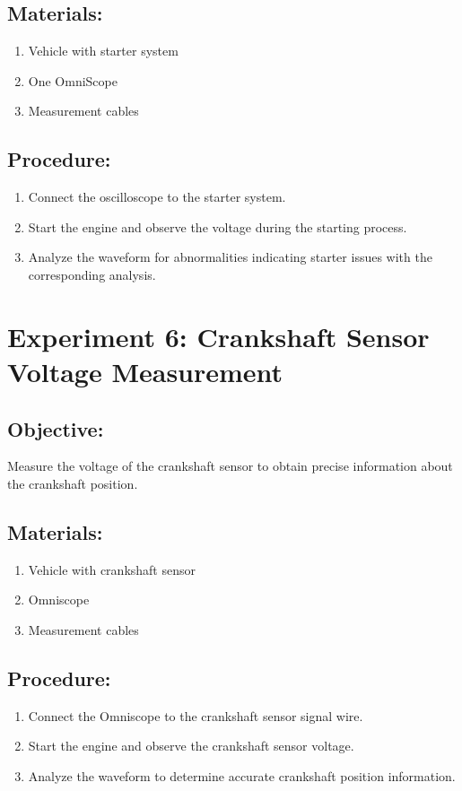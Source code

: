 \documentclass[]{scrreprt}
\begin{document}
\subsection*{Materials:}
\begin{enumerate}
    \item Vehicle with starter system
    \item One OmniScope
    \item Measurement cables
\end{enumerate}
\subsection*{Procedure:}
\begin{enumerate}
    \item Connect the oscilloscope to the starter system.
    \item Start the engine and observe the voltage during the starting process.
    \item Analyze the waveform for abnormalities indicating starter issues with the corresponding analysis.
\end{enumerate}

\section*{Experiment 6: Crankshaft Sensor Voltage Measurement}
\subsection*{Objective:} Measure the voltage of the crankshaft sensor to obtain precise information about the crankshaft position.
\subsection*{Materials:}
\begin{enumerate}
    \item Vehicle with crankshaft sensor
    \item Omniscope
    \item Measurement cables
\end{enumerate}
\subsection*{Procedure:}
\begin{enumerate}
    \item Connect the Omniscope to the crankshaft sensor signal wire.
    \item Start the engine and observe the crankshaft sensor voltage.
    \item Analyze the waveform to determine accurate crankshaft position information.
\end{enumerate}
\end{document}
